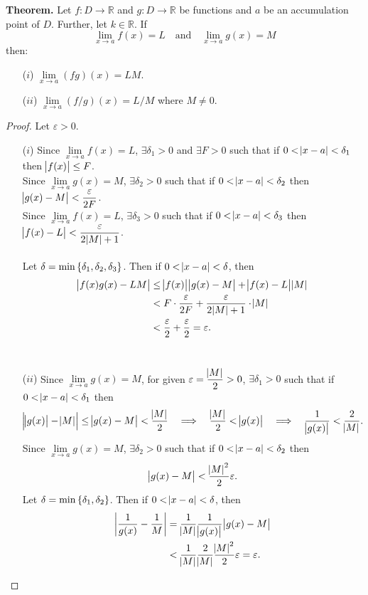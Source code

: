 \documentclass[12pt,a4paper]{article}
\newcommand{\dispsty}{\displaystyle}
\begin{document}
\begin{tcolorbox}[colback=white]
	\textbf{Theorem.} Let $f:D\to\mathbb{R}$ and $g:D\to\mathbb{R}$ be functions and $a$ be an accumulation point of $D$. Further, let $k\in\mathbb{R}$. If \[
	\lim\limits_{x\to a}f(x)=L\quad\text{and}\quad\lim\limits_{x\to a}g(x)=M
	\] then: \begin{itemize}
		\item[($i$)] \(\lim\limits_{x\to a}(fg)(x)=LM\).
		\item[($ii$)] \(\lim\limits_{x\to a}(f/g)(x)=L/M\) where $M\neq 0$.
	\end{itemize}\tcblower\begin{proof} Let $\varepsilon>0$. \begin{itemize}
		\item[($i$)] Since $\lim\limits_{x\to a}f(x)=L$, $\exists\delta_1>0$ and $\exists F>0$ such that if $0<\abs{x-a}<\delta_1$ then $\abs{f(x)}\leq F$. \\
		Since $\lim\limits_{x\to a}g(x)=M$, $\exists\delta_2>0$ such that if $0<\abs{x-a}<\delta_2$ then $\dispsty\abs{g(x)-M}<\frac{\varepsilon}{2F}$.\\
		Since $\lim\limits_{x\to a}f(x)=L$, $\exists\delta_3>0$ such that if $0<\abs{x-a}<\delta_3$ then $\dispsty\abs{f(x)-L}<\frac{\varepsilon}{2\abs{M}+1}$.\\
		\\
		Let $\delta=\min\set{\delta_1,\delta_2,\delta_3}$. Then if \(0<\abs{x-a}<\delta\), then \begin{align*}
		\abs{f(x)g(x)-LM}&\leq\abs{f(x)}\abs{g(x)-M}+\abs{f(x)-L}\abs{M} \\
		&<F\cdot\frac{\varepsilon}{2F}+\frac{\varepsilon}{2\abs{M}+1}\cdot \abs{M} \\
		&<\frac{\varepsilon}{2}+\frac{\varepsilon}{2}=\varepsilon.
		\end{align*}\
		\\
		\item[($ii$)] Since $\lim\limits_{x\to a}g(x)=M$, for given $\dispsty\varepsilon=\frac{\abs{M}}{2}>0$, $\exists\delta_1>0$ such that if $0<\abs{x-a}<\delta_1$ then \[
		\abs{\abs{g(x)}-\abs{M}}\leq\abs{g(x)-M}<\frac{\abs{M}}{2}\quad\Longrightarrow\quad\frac{\abs{M}}{2}<\abs{g(x)}\quad\Longrightarrow\quad \frac{1}{\abs{g(x)}}<\frac{2}{\abs{M}}.
		\]
		Since $\lim\limits_{x\to a}g(x)=M$, $\exists\delta_2>0$ such that if $0<\abs{x-a}<\delta_2$ then \[
		\abs{g(x)-M}<\frac{\abs{M}^2}{2}\varepsilon.
		\] Let $\delta=\min\set{\delta_1,\delta_2}$. Then if $0<\abs{x-a}<\delta$, then \begin{align*}
		\abs{\frac{1}{g(x)}-\frac{1}{M}}&=\frac{1}{\abs{M}}\frac{1}{\abs{g(x)}}\abs{g(x)-M} \\
		&<\frac{1}{\abs{M}}\frac{2}{\abs{M}}\frac{\abs{M}^2}{2}\varepsilon=\varepsilon.
		\end{align*}
	\end{itemize}
	\end{proof}
\end{tcolorbox}
\end{document}
